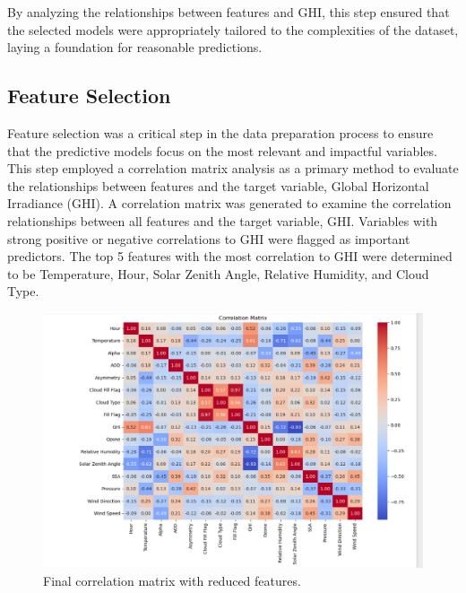 \documentclass[10pt,twocolumn]{article}
\begin{document}
\begin{itemize}
By analyzing the relationships between features and GHI, this step ensured that the selected models were appropriately tailored to the complexities of the dataset, laying a foundation for reasonable predictions.



 \subsection{Feature Selection}
Feature selection was a critical step in the data preparation process to ensure that the predictive models focus on the most relevant and impactful variables. This step employed a correlation matrix analysis as a primary method to evaluate the relationships between features and the target variable, Global Horizontal Irradiance (GHI).
A correlation matrix was generated to examine the correlation relationships between all features and the target variable, GHI. Variables with strong positive or negative correlations to GHI were flagged as important predictors. The top 5 features with the most correlation to GHI were determined to be Temperature, Hour, Solar Zenith Angle, Relative Humidity, and Cloud Type.
\begin{figure}
            \centering
            \includegraphics[width=1\linewidth]{fincorr.png}
            \caption{Final correlation matrix with reduced features.}
            \label{fig:enter-label}
        \end{figure}
         
    
    \label{Figure 1}





\end{itemize}
\end{document}

